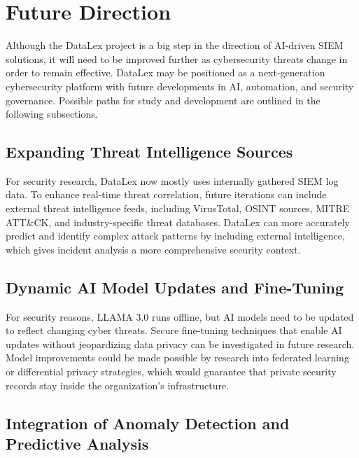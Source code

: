 \section{Future Direction}
\label{sec_future_direction}

Although the DataLex project is a big step in the direction of AI-driven SIEM solutions, it will need to be improved further as cybersecurity threats change in order to remain effective. DataLex may be positioned as a next-generation cybersecurity platform with future developments in AI, automation, and security governance. Possible paths for study and development are outlined in the following subsections.

\subsection{Expanding Threat Intelligence Sources}
\label{subsec_expanding_threat_intelligence_sources}

For security research, DataLex now mostly uses internally gathered SIEM log data. To enhance real-time threat correlation, future iterations can include external threat intelligence feeds, including VirusTotal, OSINT sources, MITRE ATT\&CK, and industry-specific threat databases. DataLex can more accurately predict and identify complex attack patterns by including external intelligence, which gives incident analysis a more comprehensive security context.

\subsection{Dynamic AI Model Updates and Fine-Tuning}
\label{subsec_dynamic_ai_model_updates}

For security reasons, LLAMA 3.0 runs offline, but AI models need to be updated to reflect changing cyber threats. Secure fine-tuning techniques that enable AI updates without jeopardizing data privacy can be investigated in future research. Model improvements could be made possible by research into federated learning or differential privacy strategies, which would guarantee that private security records stay inside the organization's infrastructure.

\subsection{Integration of Anomaly Detection and Predictive Analysis}
\label{subsec_integration_anomaly_detection}

